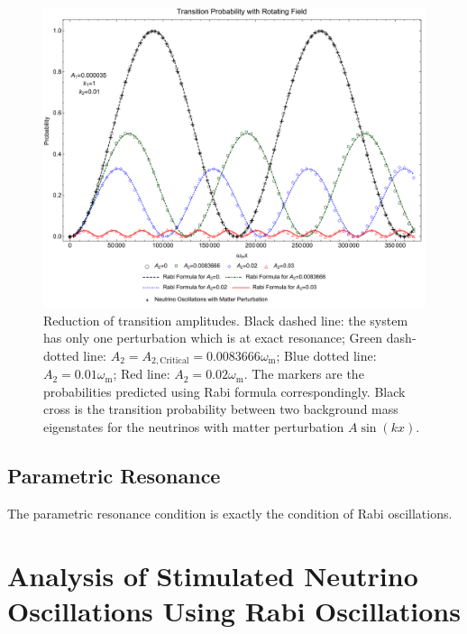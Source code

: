 \documentclass[%
preprint,
 amsmath,amssymb,
 aps,
]{revtex4-1}
\begin{document}
\begin{figure}[!htbp]
                \centering
                \includegraphics[width=\textwidth]{assets/rabi-oscillations-energy-gap-change-k2-0-01}
                \caption{Reduction of transition amplitudes. Black dashed line: the system has only one perturbation which is at exact resonance; Green dash-dotted line: $A_2=A_{2,\mathrm{Critical}}=0.0083666\omega_{\mathrm m}$; Blue dotted line: $A_2=0.01\omega_{\mathrm m}$; Red line: $A_2=0.02\omega_{\mathrm m}$. The markers are the probabilities predicted using Rabi formula correspondingly. Black cross is the transition probability between two background mass eigenstates for the neutrinos with matter perturbation $A\sin(kx)$.}
                \label{fig-rabi-oscillations-energy-gap-change}
\end{figure}



\subsection{Parametric Resonance}

The parametric resonance condition is exactly the condition of Rabi oscillations.








\section{\label{stimulated}Analysis of Stimulated Neutrino Oscillations Using Rabi Oscillations}
\end{document}
